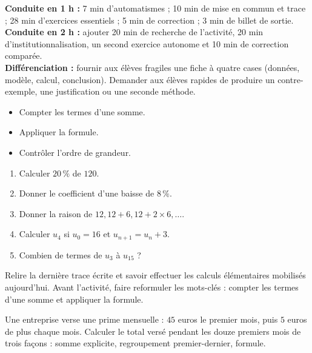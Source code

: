 \ifprof
\begin{methode}
\textbf{Conduite en 1 h :} 7 min d'automatismes ; 10 min de mise en commun et trace ; 28 min d'exercices essentiels ; 5 min de correction ; 3 min de billet de sortie.\\
\textbf{Conduite en 2 h :} ajouter 20 min de recherche de l'activité, 20 min d'institutionnalisation, un second exercice autonome et 10 min de correction comparée.\\
\textbf{Différenciation :} fournir aux élèves fragiles une fiche à quatre cases (données, modèle, calcul, conclusion). Demander aux élèves rapides de produire un contre-exemple, une justification ou une seconde méthode.
\end{methode}
\fi
{}
\begin{objectifs}\begin{itemize}\item Compter les termes d'une somme.\item Appliquer la formule.\item Contrôler l'ordre de grandeur.\end{itemize}\end{objectifs}
\begin{automatismes}\begin{enumerate}\item Calculer $20\,\%$ de $120$. \item Donner le coefficient d'une baisse de $8\,\%$. \item Donner la raison de $12,12+6,12+2\times6,\ldots$. \item Calculer $u_4$ si $u_0=16$ et $u_{n+1}=u_n+3$. \item Combien de termes de $u_3$ à $u_{15}$ ? \end{enumerate}\end{automatismes}
\begin{prerequis}Relire la dernière trace écrite et savoir effectuer les calculs élémentaires mobilisés aujourd'hui. Avant l'activité, faire reformuler les mots-clés : compter les termes d'une somme et appliquer la formule.\end{prerequis}

\begin{activite}
Une entreprise verse une prime mensuelle : $45$ euros le premier mois, puis $5$ euros de plus chaque mois. Calculer le total versé pendant les douze premiers mois de trois façons : somme explicite, regroupement premier-dernier, formule.

\end{activite}

